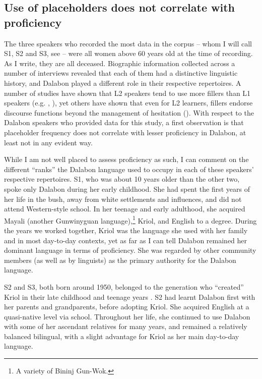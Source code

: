 \documentclass[output=paper]{langscibook}
\begin{document}
\subsection{Use of placeholders does not correlate with proficiency}
\label{sec:ponsonnet:4.1}
The three speakers who recorded the most data in the corpus – whom I will call S1, S2 and S3, see  – were all women above 60 years old at the time of recording. As I write, they are all deceased. Biographic information collected across a number of interviews revealed that each of them had a distinctive linguistic history, and Dalabon played a different role in their respective repertoires. A number of studies have shown that L2 speakers tend to use more fillers than L1 speakers (e.g. \citealt{FehringerFehringer2007}, \citealt{Jong2016}), yet others have shown that even for L2 learners, fillers endorse discourse functions beyond the management of hesitation (\citealt{KosmalaCrible2022}). With respect to the Dalabon speakers who provided data for this study, a first observation is that placeholder frequency does not correlate with lesser proficiency in Dalabon, at least not in any evident way. 

While I am not well placed to assess proficiency as such, I can comment on the different “ranks” the Dalabon language used to occupy in each of these speakers’ respective repertoires. S1, who was about 10 years older than the other two, spoke only Dalabon during her early childhood. She had spent the first years of her life in the bush, away from white settlements and influences, and did not attend Western-style school. In her teenage and early adulthood, she acquired Mayali (another Gunwinyguan language),\footnote{A variety of Bininj Gun-Wok.} Kriol, and English to a degree. During the years we worked together, Kriol was the language she used with her family and in most day-to-day contexts, yet as far as I can tell Dalabon remained her dominant language in terms of proficiency. She was regarded by other community members (as well as by linguists) as the primary authority for the Dalabon language.

S2 and S3, both born around 1950, belonged to the generation who “created” Kriol in their late childhood and teenage years \citep{Ponsonnet2010}. S2 had learnt Dalabon first with her parents and grandparents, before adopting Kriol. She acquired English at a quasi-native level via school. Throughout her life, she continued to use Dalabon with some of her ascendant relatives for many years, and remained a relatively balanced bilingual, with a slight advantage for Kriol as her main day-to-day language. 
\end{document}
